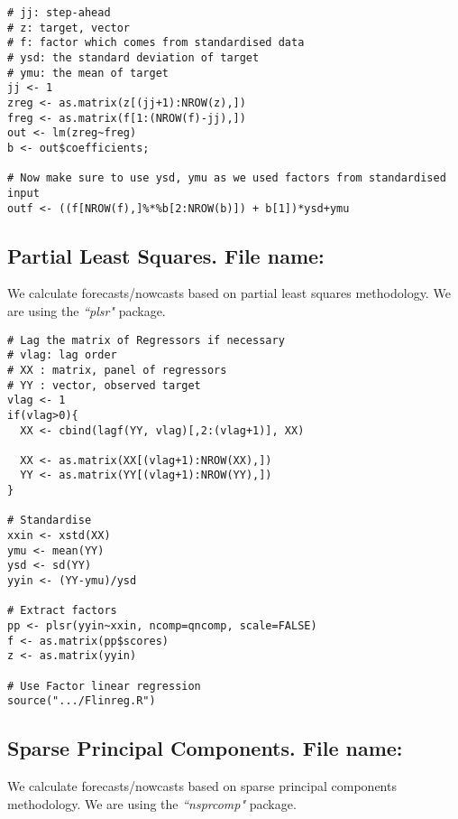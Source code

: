 \documentclass[12pt]{article}
\begin{document}
\begin{lstlisting}[title=\textbf{Factor Linear Regression.}]
# jj: step-ahead
# z: target, vector
# f: factor which comes from standardised data
# ysd: the standard deviation of target
# ymu: the mean of target
jj <- 1
zreg <- as.matrix(z[(jj+1):NROW(z),])
freg <- as.matrix(f[1:(NROW(f)-jj),])
out <- lm(zreg~freg)
b <- out$coefficients;

# Now make sure to use ysd, ymu as we used factors from standardised input
outf <- ((f[NROW(f),]%*%b[2:NROW(b)]) + b[1])*ysd+ymu
\end{lstlisting}

\subsection{Partial Least Squares. File name: \color{blue}{pls.R}}

We calculate forecasts/nowcasts based on partial least squares methodology. We
are using the \emph{``plsr"} package.

\begin{lstlisting}[title=\textbf{Factor Linear Regression.}]
# Lag the matrix of Regressors if necessary
# vlag: lag order
# XX : matrix, panel of regressors
# YY : vector, observed target
vlag <- 1
if(vlag>0){
  XX <- cbind(lagf(YY, vlag)[,2:(vlag+1)], XX)

  XX <- as.matrix(XX[(vlag+1):NROW(XX),])
  YY <- as.matrix(YY[(vlag+1):NROW(YY),])
}

# Standardise
xxin <- xstd(XX)
ymu <- mean(YY)
ysd <- sd(YY)
yyin <- (YY-ymu)/ysd

# Extract factors
pp <- plsr(yyin~xxin, ncomp=qncomp, scale=FALSE)
f <- as.matrix(pp$scores)
z <- as.matrix(yyin)

# Use Factor linear regression
source(".../Flinreg.R")
\end{lstlisting}

\subsection{Sparse Principal Components. File name: \color{blue}{spc.R}}

We calculate forecasts/nowcasts based on sparse principal components
methodology. We are using the \emph{``nsprcomp"} package.
\end{document}
